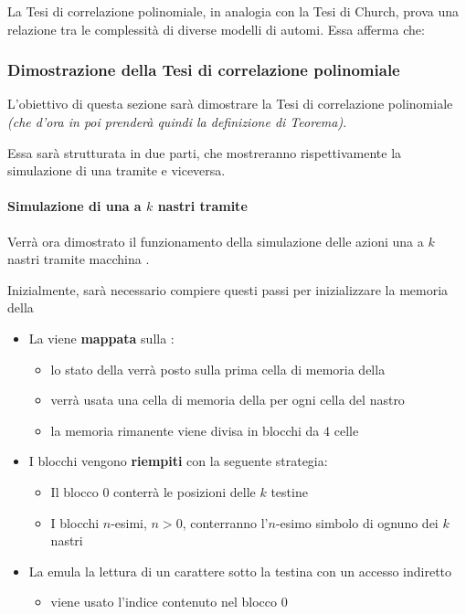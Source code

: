 \documentclass[italian, 10pt]{article}
\begin{document}
La Tesi di correlazione polinomiale, in analogia con la Tesi di Church, prova una relazione tra le complessità di diverse modelli di automi.
Essa afferma che:


\subsubsection{Dimostrazione della Tesi di correlazione polinomiale}

L'obiettivo di questa sezione sarà dimostrare la Tesi di correlazione polinomiale \textit{(che d'ora in poi prenderà quindi la definizione di Teorema)}.

Essa sarà strutturata in due parti, che mostreranno rispettivamente la simulazione di una \TM tramite \RAM e viceversa.

\paragraph[Simulazione di una \TM a k nastri tramite \RAM]{Simulazione di una \TM a \(k\) nastri tramite \RAM}

Verrà ora dimostrato il funzionamento della simulazione delle azioni una \TM a \(k\) nastri tramite macchina \RAM.

Inizialmente, sarà necessario compiere questi passi per inizializzare la memoria della \RAM

\begin{itemize}
  \item La \TM viene \textbf{mappata} sulla \RAM:
        \begin{itemize}
          \item lo stato della \TM verrà posto sulla prima cella di memoria della \RAM
          \item verrà usata una cella di memoria della \RAM per ogni cella del nastro
          \item la memoria rimanente viene divisa in blocchi da \(4\) celle
        \end{itemize}
  \item I blocchi vengono \textbf{riempiti} con la seguente strategia:
        \begin{itemize}
          \item Il blocco \(0\) conterrà le posizioni delle \(k\) testine
          \item I blocchi \(n\)-esimi, \(n > 0\), conterranno l'\(n\)-esimo simbolo di ognuno dei \(k\) nastri
        \end{itemize}
  \item La \RAM emula la lettura di un carattere sotto la testina con un accesso indiretto
        \begin{itemize}
          \item viene usato l'indice contenuto nel blocco \(0\)
        \end{itemize}
\end{itemize}
\end{document}
